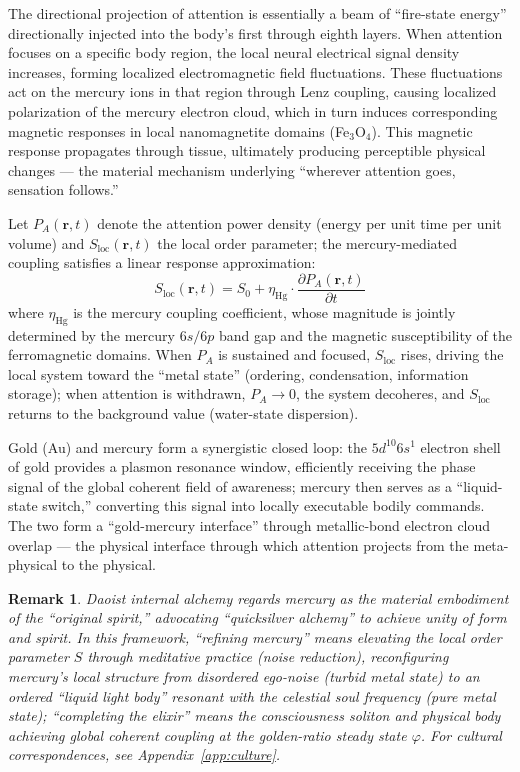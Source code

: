 \documentclass[12pt,a4paper,twocolumn]{article}
\renewcommand{\phi}{\varphi}
\newtheorem{remark}[theorem]{Remark}
\begin{document}
The directional projection of attention is essentially a beam of ``fire-state energy'' directionally injected into the body's first through eighth layers. When attention focuses on a specific body region, the local neural electrical signal density increases, forming localized electromagnetic field fluctuations. These fluctuations act on the mercury ions in that region through Lenz coupling, causing localized polarization of the mercury electron cloud, which in turn induces corresponding magnetic responses in local nanomagnetite domains (Fe$_3$O$_4$). This magnetic response propagates through tissue, ultimately producing perceptible physical changes --- the material mechanism underlying ``wherever attention goes, sensation follows.''

Let $P_A(\mathbf{r}, t)$ denote the attention power density (energy per unit time per unit volume) and $S_{\text{loc}}(\mathbf{r}, t)$ the local order parameter; the mercury-mediated coupling satisfies a linear response approximation:
\begin{equation}
S_{\text{loc}}(\mathbf{r}, t) = S_0 + \eta_{\text{Hg}} \cdot \frac{\partial P_A(\mathbf{r}, t)}{\partial t}
\end{equation}
where $\eta_{\text{Hg}}$ is the mercury coupling coefficient, whose magnitude is jointly determined by the mercury $6s/6p$ band gap and the magnetic susceptibility of the ferromagnetic domains. When $P_A$ is sustained and focused, $S_{\text{loc}}$ rises, driving the local system toward the ``metal state'' (ordering, condensation, information storage); when attention is withdrawn, $P_A \to 0$, the system decoheres, and $S_{\text{loc}}$ returns to the background value (water-state dispersion).

Gold (Au) and mercury form a synergistic closed loop: the $5d^{10}6s^1$ electron shell of gold provides a plasmon resonance window, efficiently receiving the phase signal of the global coherent field of awareness; mercury then serves as a ``liquid-state switch,'' converting this signal into locally executable bodily commands. The two form a ``gold-mercury interface'' through metallic-bond electron cloud overlap --- the physical interface through which attention projects from the meta-physical to the physical.

\begin{remark}
Daoist internal alchemy regards mercury as the material embodiment of the ``original spirit,'' advocating ``quicksilver alchemy'' to achieve unity of form and spirit. In this framework, ``refining mercury'' means elevating the local order parameter $S$ through meditative practice (noise reduction), reconfiguring mercury's local structure from disordered ego-noise (turbid metal state) to an ordered ``liquid light body'' resonant with the celestial soul frequency (pure metal state); ``completing the elixir'' means the consciousness soliton and physical body achieving global coherent coupling at the golden-ratio steady state $\phi$. For cultural correspondences, see Appendix~\ref{app:culture}.
\end{remark}
\end{document}
